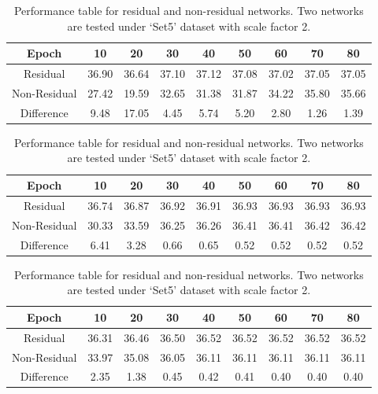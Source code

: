 \documentclass[10pt,twocolumn,letterpaper]{article}
\begin{document}
\begin{table}
\centering
\begin{subtable}[t]{0.9\linewidth}
\centering
\begin{tabular}{|c||c|c|c|c|c|c|c|c|}
\hline
 Epoch& 10& 20& 30& 40& 50& 60& 70& 80\\\hline
 Residual& 36.90& 36.64& 37.10& 37.12& 37.08& 37.02& 37.05& 37.05\\
 Non-Residual& 27.42& 19.59& 32.65& 31.38& 31.87& 34.22& 35.80& 35.66\\\hline
 Difference& 9.48& 17.05& 4.45& 5.74& 5.20& 2.80& 1.26& 1.39\\\hline
\end{tabular}
\caption{Initial learning rate 0.1}
\end{subtable}
\begin{subtable}[t]{0.9\linewidth}
\centering
\begin{tabular}{|c||c|c|c|c|c|c|c|c|}
\hline
 Epoch& 10& 20& 30& 40& 50& 60& 70& 80\\\hline
 Residual& 36.74& 36.87& 36.92& 36.91& 36.93& 36.93& 36.93& 36.93\\
 Non-Residual& 30.33& 33.59& 36.25& 36.26& 36.41& 36.41& 36.42& 36.42\\\hline
 Difference& 6.41& 3.28& 0.66& 0.65& 0.52& 0.52& 0.52& 0.52\\\hline
\end{tabular}
\caption{Initial learning rate 0.01}
\end{subtable}
\begin{subtable}[t]{0.9\linewidth}
\centering
\begin{tabular}{|c||c|c|c|c|c|c|c|c|}
\hline
 Epoch& 10& 20& 30& 40& 50& 60& 70& 80\\\hline
 Residual& 36.31& 36.46& 36.50& 36.52& 36.52& 36.52& 36.52& 36.52\\
 Non-Residual& 33.97& 35.08& 36.05& 36.11& 36.11& 36.11& 36.11& 36.11\\\hline
 Difference& 2.35& 1.38& 0.45& 0.42& 0.41& 0.40& 0.40& 0.40\\\hline
\end{tabular}
\caption{Initial learning rate 0.001}
\end{subtable}
\caption{Performance table for residual and non-residual networks. Two networks are tested under `Set5' dataset with scale factor 2.}
\end{table}
\end{document}
